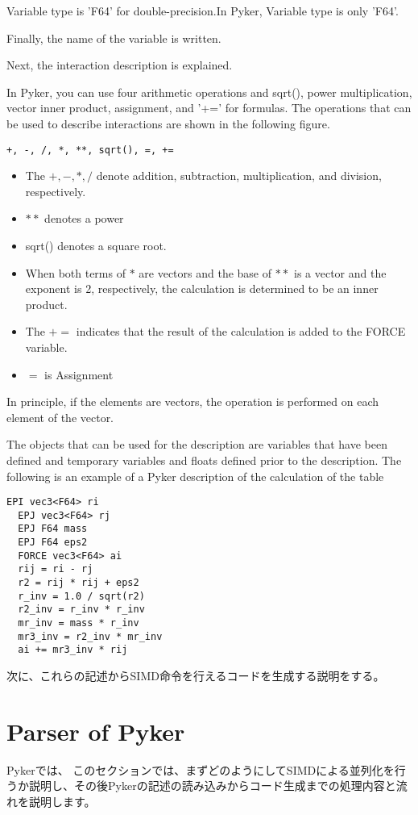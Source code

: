 \documentclass[ams]{article}
\begin{document}
Variable type is 'F64' for double-precision.In Pyker, Variable type is only 'F64'.

Finally, the name of the variable is written.


Next, the interaction description is explained.

In Pyker, you can use four arithmetic operations and sqrt(), power 
multiplication, vector inner product, assignment, and '+=' for formulas.
The operations that can be used to describe interactions are 
shown in the following figure.
\begin{lstlisting}[frame=single]
 +, -, /, *, **, sqrt(), =, +=
\end{lstlisting}
\begin{itemize}
  \item The $+, -, *,  /$ denote addition, subtraction, 
  multiplication, and division, respectively. 
  \item $**$ denotes a power
  \item sqrt() denotes a square root.
  \item When both terms of $*$ are vectors and the base of $**$ is 
  a vector and the exponent is 2, respectively, the calculation is
   determined to be an inner product.
  \item The $+=$ indicates that the result of the calculation is added to the FORCE variable. 
  \item $=$ is Assignment
\end{itemize}

In principle, if the elements are vectors, the operation is
performed on each element of the vector.


 The objects that can be used for the description are variables 
 that have been defined and temporary variables and floats defined 
 prior to the description.
 The following is an example of a Pyker description 
 of the calculation of the table \label{eq:gravity}
\begin{lstlisting}[frame=single, caption=gravity\_interparticle, label=fuga]
  EPI vec3<F64> ri
  EPJ vec3<F64> rj
  EPJ F64 mass
  EPJ F64 eps2
  FORCE vec3<F64> ai
  rij = ri - rj
  r2 = rij * rij + eps2
  r_inv = 1.0 / sqrt(r2)
  r2_inv = r_inv * r_inv
  mr_inv = mass * r_inv
  mr3_inv = r2_inv * mr_inv
  ai += mr3_inv * rij
\end{lstlisting}

次に、これらの記述からSIMD命令を行えるコードを生成する説明をする。

\section{Parser of Pyker}
Pykerでは、
このセクションでは、まずどのようにしてSIMDによる並列化を行うか説明し、その後Pykerの記述の読み込みからコード生成までの処理内容と流れを説明します。
\end{document}
